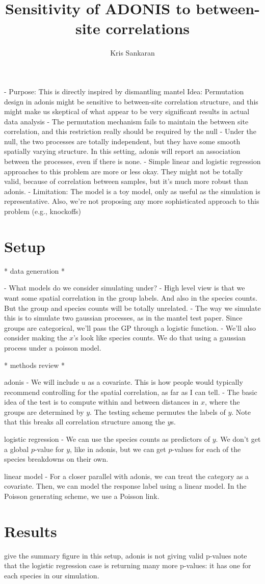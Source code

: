 \documentclass{article}
\title{Sensitivity of ADONIS to between-site correlations}
\author{Kris Sankaran}
\begin{document}
- Purpose: This is directly inspired by dismantling mantel Idea: Permutation
design in adonis might be sensitive to between-site correlation structure, and
this might make us skeptical of what appear to be very significant results in
actual data analysis
- The permutation mechanism fails to maintain the between site correlation, and
this restriction really should be required by the null
- Under the null, the two processes are totally independent, but they have some
smooth spatially varying structure. In this setting, adonis will report an
association between the processes, even if there is none.
- Simple linear and logistic regression approaches to this problem are more or
less okay. They might not be totally valid, because of correlation between
samples, but it's much more robust than adonis.
- Limitation: The model is a toy model, only as useful as the simulation is
representative. Also, we're not proposing any more sophisticated approach to
this problem (e.g., knockoffs)

\section{Setup}
\label{sec:setup}

* data generation *

- What models do we consider simulating under?
- High level view is that we want some spatial correlation in the group labels.
And also in the species counts. But the group and species counts will be totally
unrelated.
- The way we simulate this is to simulate two gaussian processes, as in the
mantel test paper. Since groups are categorical, we'll pass the GP through a
logistic function.
- We'll also consider making the $x$'s look like species counts. We do that
using a gaussian process under a poisson model.

* methods review *

adonis
- We will include $u$ as a covariate. This is how people would typically
recommend controlling for the spatial correlation, as far as I can tell.
- The basic idea of the test is to compute within and between distances in $x$,
where the groups are determined by $y$. The testing scheme permutes the labels
of $y$. Note that this breaks all correlation structure among the $y$s.

logistic regression
- We can use the species counts as predictors of $y$. We don't get a global
$p$-value for $y$, like in adonis, but we can get $p$-values for each of the
species breakdowns on their own.

linear model
- For a closer parallel with adonis, we can treat the category as a covariate.
Then, we can model the response label using a linear model. In the Poisson
generating scheme, we use a Poisson link.

\section{Results}
\label{sec:results}

give the summary figure
in this setup, adonis is not giving valid p-values
note that the logistic regression case is returning many more p-values: it has
one for each species in our simulation.
\end{document}
